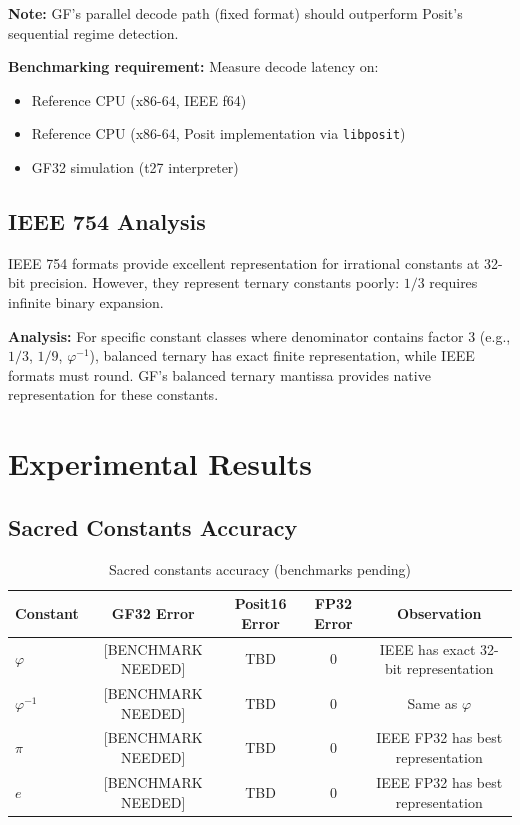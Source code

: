 \documentclass{article}
\begin{document}
\textbf{Note:} GF's parallel decode path (fixed format) should outperform Posit's sequential regime detection.

\textbf{Benchmarking requirement:} Measure decode latency on:
\begin{itemize}
    \item Reference CPU (x86-64, IEEE f64)
    \item Reference CPU (x86-64, Posit implementation via \texttt{libposit})
    \item GF32 simulation (t27 interpreter)
\end{itemize}

\subsection{IEEE 754 Analysis}

IEEE 754 formats provide excellent representation for irrational constants at 32-bit precision. However, they represent ternary constants poorly: $1/3$ requires infinite binary expansion.

\textbf{Analysis:} For specific constant classes where denominator contains factor 3 (e.g., $1/3$, $1/9$, $\varphi^{-1}$), balanced ternary has exact finite representation, while IEEE formats must round. GF's balanced ternary mantissa provides native representation for these constants.


\section{Experimental Results}

\subsection{Sacred Constants Accuracy}

\begin{table}[h]
\centering
\begin{tabular}{lcccc}
\toprule
Constant & GF32 Error & Posit16 Error & FP32 Error & Observation \\
\midrule
$\varphi$ & [BENCHMARK NEEDED] & TBD & 0 & IEEE has exact 32-bit representation \\
$\varphi^{-1}$ & [BENCHMARK NEEDED] & TBD & 0 & Same as $\varphi$ \\
$\pi$ & [BENCHMARK NEEDED] & TBD & 0 & IEEE FP32 has best representation \\
$e$ & [BENCHMARK NEEDED] & TBD & 0 & IEEE FP32 has best representation \\
\bottomrule
\end{tabular}
\caption{Sacred constants accuracy (benchmarks pending)}
\end{table}
\end{document}
